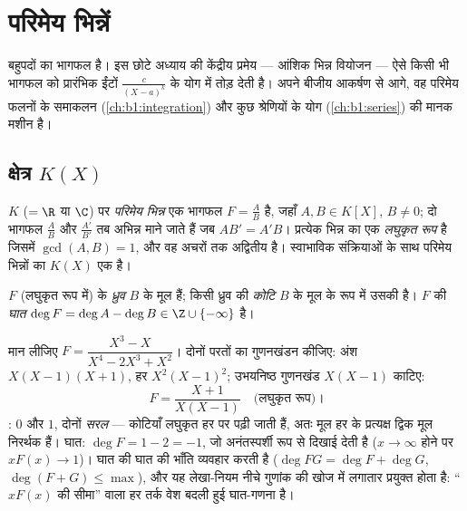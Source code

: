 \chapter{परिमेय भिन्नें}\label{ch:b1:fractions}

 बहुपदों का भागफल है। इस छोटे अध्याय की केंद्रीय प्रमेय ---
आंशिक भिन्न वियोजन --- ऐसे किसी भी भागफल को
प्रारंभिक ईंटों $\frac{c}{(X - a)^k}$ के योग में तोड़ देती है। अपने बीजीय
आकर्षण से आगे, वह परिमेय फलनों के समाकलन (\cref{ch:b1:integration}) और कुछ
श्रेणियों के योग (\cref{ch:b1:series}) की मानक मशीन है।

\section{क्षेत्र $K(X)$}

\begin{definition}\label{def:b1:fractions:field}
$K$ ($= \R$ या $\C$) पर \emph{परिमेय भिन्न} एक भागफल $F
= \frac{A}{B}$ है, जहाँ $A, B \in K[X]$, $B \neq 0$; दो भागफल $\frac AB$ और
$\frac{A'}{B'}$ तब अभिन्न माने जाते हैं जब $AB' = A'B$। प्रत्येक भिन्न का एक
\emph{लघुकृत रूप} है जिसमें $\gcd(A, B) = 1$, और वह अचरों तक अद्वितीय है।
स्वाभाविक संक्रियाओं के साथ परिमेय भिन्नों का  $K(X)$ एक  है।

$F$ (लघुकृत रूप में) के \emph{ध्रुव} $B$ के मूल हैं; किसी ध्रुव
की \emph{कोटि} $B$ के मूल के रूप में उसकी  है। $F$ की \emph{घात} $\deg
F = \deg A - \deg B \in \Z \cup \{-\infty\}$ है।
\end{definition}

\begin{example}[ध्रुव, कोटियाँ और घात पढ़ना]\label{ex:b1:fractions:vocab}
मान लीजिए $F = \dfrac{X^3 - X}{X^4 - 2X^3 + X^2}$। दोनों परतों का गुणनखंडन
कीजिए: अंश $X(X-1)(X+1)$, हर $X^2(X-1)^2$; उभयनिष्ठ गुणनखंड $X(X-1)$ काटिए:
\[
F = \frac{X + 1}{X(X - 1)} \quad\text{(लघुकृत रूप)।}
\]
: $0$ और $1$, दोनों \emph{सरल} --- कोटियाँ लघुकृत हर पर पढ़ी जाती हैं,
अतः मूल हर के प्रत्यक्ष द्विक मूल निरर्थक हैं। घात: $\deg F = 1 - 2 = -1$,
जो अनंतस्पर्शी रूप से दिखाई देती है ($x \to \infty$ होने पर $xF(x) \to 1$)।
घात  की घात की भाँति व्यवहार करती है ($\deg FG = \deg F + \deg G$,
$\deg(F + G) \leq \max$), और यह लेखा-नियम नीचे गुणांक की खोज में लगातार
प्रयुक्त होता है: ``$xF(x)$ की सीमा'' वाला हर तर्क वेश बदली हुई घात-गणना है।
\end{example}

